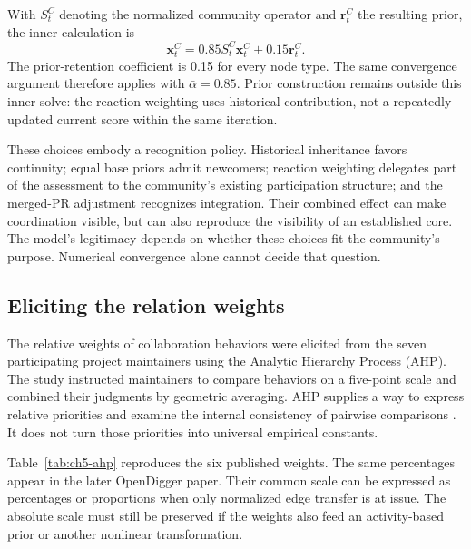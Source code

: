 With \(S^C_t\) denoting the normalized community operator and \(\boldsymbol r^C_t\) the resulting prior, the inner calculation is
\begin{equation}
 \boldsymbol x^C_t=0.85S^C_t\boldsymbol x^C_t
                  +0.15\boldsymbol r^C_t.
 \label{eq:ch5-community}
\end{equation}
The prior-retention coefficient is 0.15 for every node type. The same convergence argument therefore applies with \(\bar\alpha=0.85\). Prior construction remains outside this inner solve: the reaction weighting uses historical contribution, not a repeatedly updated current score within the same iteration.

These choices embody a recognition policy. Historical inheritance favors continuity; equal base priors admit newcomers; reaction weighting delegates part of the assessment to the community's existing participation structure; and the merged-PR adjustment recognizes integration. Their combined effect can make coordination visible, but can also reproduce the visibility of an established core. The model's legitimacy depends on whether these choices fit the community's purpose. Numerical convergence alone cannot decide that question.

\subsection{Eliciting the relation weights}
The relative weights of collaboration behaviors were elicited from the seven participating project maintainers using the Analytic Hierarchy Process (AHP). The study instructed maintainers to compare behaviors on a five-point scale and combined their judgments by geometric averaging. AHP supplies a way to express relative priorities and examine the internal consistency of pairwise comparisons \citep{saaty1987}. It does not turn those priorities into universal empirical constants.

Table~\ref{tab:ch5-ahp} reproduces the six published weights. The same percentages appear in the later OpenDigger paper. Their common scale can be expressed as percentages or proportions when only normalized edge transfer is at issue. The absolute scale must still be preserved if the weights also feed an activity-based prior or another nonlinear transformation.

